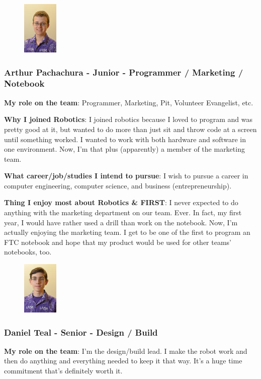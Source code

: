\begin{figure}
	\centering
	\includegraphics[height=1in]{arthur}
\end{figure}
\subsubsection{Arthur Pachachura - Junior - Programmer /  Marketing / Notebook} 
{\bf My role on the team}: Programmer, Marketing, Pit, Volunteer Evangelist, etc.

{\bf Why I joined Robotics}: I joined robotics because I loved to program and was pretty good at it, but wanted to do more than just sit and throw code at a screen until something worked.  I wanted to work with both hardware and software in one environment.  Now, I'm that plus (apparently) a member of the marketing team.

{\bf What career/job/studies I intend to pursue}: I wish to pursue a career in computer engineering, computer science, and business (entrepreneurship).

{\bf Thing I enjoy most about Robotics \& FIRST}: I never expected to do anything with the marketing department on our team.  Ever.  In fact, my first year, I would have rather used a drill than work on the notebook.  Now, I'm actually enjoying the marketing team.  I get to be one of the first to program an FTC notebook and hope that my product would be used for other teams' notebooks, too.

\begin{figure}
	\centering
	\includegraphics[height=1in]{daniel}
\end{figure}
\subsubsection{Daniel Teal - Senior - Design / Build} 
{\bf My role on the team}: I'm the design/build lead. I make the robot work and then do anything and everything needed to keep it that way. It's a huge time commitment that's definitely worth it.

